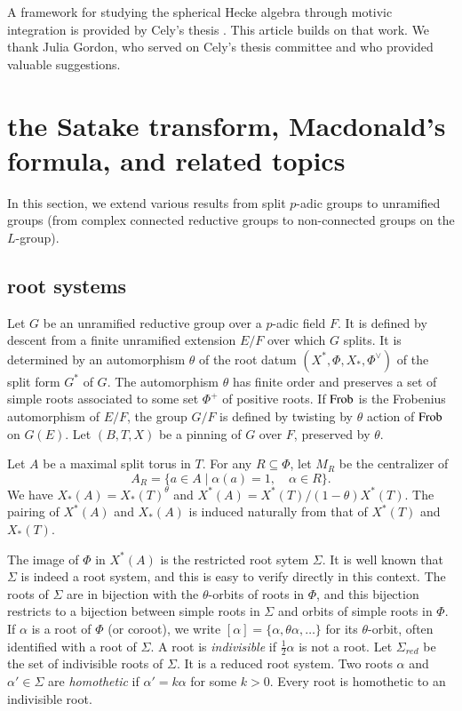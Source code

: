 A framework for studying the spherical Hecke algebra through motivic integration is provided by Cely's thesis \cite{cely}.
This article builds on that work.  We thank Julia Gordon, who served on Cely's thesis committee and who provided valuable suggestions.



\section{the Satake transform, Macdonald's formula, and related topics}

In this section, we extend various results from split $p$-adic groups to unramified groups
(from
complex connected reductive groups to non-connected groups on the $L$-group).

\subsection{root systems}

Let $G$ be an unramified reductive group over a $p$-adic field $F$.  It is defined by
descent from a finite unramified extension $E/F$ over which $G$ splits.  It is determined by an automorphism
$\theta$ of the root datum $(X^*,\Phi,X_*,\Phi^\vee)$ of the split form $G^*$ of $G$.     
The automorphism $\theta$
has finite order and preserves a set of simple roots associated to some set $\Phi^+$ of positive roots.
If ${\operatorname{Frob}}$ is the Frobenius automorphism of $E/F$, the group $G/F$ is defined by twisting by $\theta$
action of ${\operatorname{Frob}}$ on $G(E)$.
Let $(B,T,X)$ be a pinning of $G$ over $F$, preserved by $\theta$.

Let $A$ be a maximal split torus in $T$.
For any $R\subseteq \Phi$,
let $M_R$
be the centralizer of 
\[
A_R = \{a\in A\mid \alpha(a)=1,\quad \alpha\in R\}.
\]
We have
$X_*(A) = X_*(T)^\theta$ and $X^*(A) = X^*(T)/(1-\theta)X^*(T)$.
The pairing of $X^*(A)$ and $X_*(A)$ is induced naturally from that of $X^*(T)$ and $X_*(T)$.


The image of $\Phi$ in $X^*(A)$ is the restricted root sytem $\Sigma$.  
It is well known that $\Sigma$ is indeed a root system, and this is easy to
verify directly in this context.
The roots of $\Sigma$ are in bijection with the 
$\theta$-orbits of  roots in $\Phi$, and this bijection restricts to a bijection between
simple roots in $\Sigma$ and
 orbits of simple
roots in $\Phi$.
If $\alpha$ is a root of $\Phi$ (or coroot), we write 
$[\alpha]=\{\alpha,\theta\alpha,\ldots\}$ for its
$\theta$-orbit, often identified with a root of $\Sigma$.
A root is {\it indivisible} if $\frac12\alpha$ is not a root.
Let $\Sigma_{red}$ be the set of %
indivisible roots of $\Sigma$.
It is a reduced root system.
Two roots $\alpha$ and $\alpha'\in\Sigma$ are {\it homothetic} if $\alpha' = k\alpha$ for some $k>0$.
Every root is homothetic to an indivisible root.  %


